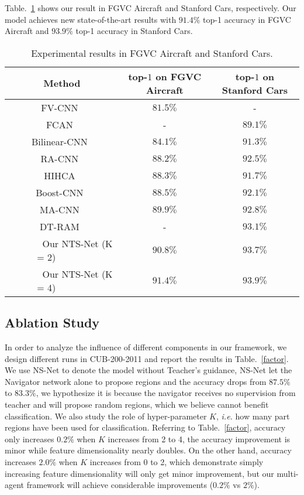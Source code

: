 \documentclass[runningheads]{llncs}
\begin{document}
Table.~\ref{aircraft_car} shows our result in FGVC Aircraft and Stanford Cars, respectively. Our model achieves new state-of-the-art results with $91.4\%$ top-1 accuracy in FGVC Aircraft and $93.9\%$ top-1 accuracy in Stanford Cars.

\begin{table}[ht]
	\begin{center}
	\begin{tabular}{|c|c|c|}
	\hline
	Method & top-$1$ on FGVC Aircraft & top-$1$ on Stanford Cars \\
	\hline\hline
	FV-CNN~\cite{Gosselin2014Revisiting} & $81.5\%$ & - \\
	\hline
	FCAN~\cite{FCAN} & - & $89.1\%$ \\
	\hline
	Bilinear-CNN~\cite{lin2015bilinear} & $84.1\%$ & $91.3\%$ \\
	\hline
	RA-CNN~\cite{Fu_2017_CVPR} & $88.2\%$ & $92.5\%$\\
	\hline
	HIHCA~\cite{Cai_2017_ICCV} & $88.3\%$ & $91.7\%$\\
	\hline
	Boost-CNN~\cite{Moghimi2016Boosted} & $88.5\%$ & $92.1\%$\\
	\hline
	MA-CNN~\cite{Zheng_2017_ICCV} & $89.9\%$ & $92.8\%$\\
	\hline
	DT-RAM~\cite{Li_2017_ICCV_Workshops} & - & $93.1\%$\\
	\hline
	\hline
	~~~~~~ Our NTS-Net (K = 2) ~~~~~~ & $90.8\%$ & $93.7\%$\\
	\hline
	~~~~~~ Our NTS-Net (K = 4) ~~~~~~ & $\mathbf{91.4\%}$ & $\mathbf{93.9\%}$\\
	\hline
	\end{tabular}
	\end{center}
\caption{Experimental results in FGVC Aircraft and Stanford Cars.}
\label{aircraft_car}
\end{table}
\subsection{Ablation Study}
In order to analyze the influence of different components in our framework, we design different runs in CUB-200-2011 and report the results in Table.~\ref{factor}. We use NS-Net to denote the model without Teacher's guidance, NS-Net let the Navigator network alone to propose regions and the accuracy drops from $87.5\%$ to $83.3\%$, we hypothesize it is because the navigator receives no supervision from teacher and will propose random regions, which we believe cannot benefit classification. We also study the role of hyper-parameter $K$, \emph{i.e.} how many part regions have been used for classification. Referring to Table.~\ref{factor}, accuracy only increases $0.2\%$ when $K$ increases from 2 to 4, the accuracy improvement is minor while feature dimensionality nearly doubles. On the other hand, accuracy increases $2.0\%$ when $K$ increases from 0 to 2, which demonstrate simply increasing feature dimensionality will only get minor improvement, but our multi-agent framework will achieve considerable improvements ($0.2\%$ vs $2\%$). 
\end{document}
